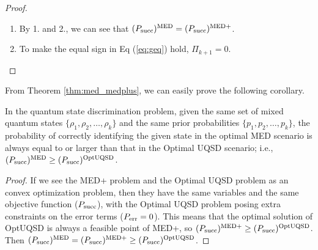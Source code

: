 \begin{proof}
\begin{enumerate}
              by
              \begin{align*}
                  \Pi_{1}' = \Pi_{1}, \; \Pi_{2}' = \Pi_{2}, \; \dots,
                  \; \Pi_{k}' = \Pi_{k} + \Pi_{k+1}
              \end{align*}
              Then,
              \begin{align}
                  (\psucc)\supmed & \geq (\psucc)^{P}
                  = \sum_{i=1}^{k} p_{i} \operatorname{tr}(\rho_{i} \Pi_{i}')                           \\
                                  & = \sum_{i=1}^{k} p_{i} \operatorname{tr}(\rho_{i} \Pi_{i})
                  + p_{k} \operatorname{tr}(\rho_{i} \Pi_{k+1})                                         \\
                                  & = (\psucc)\supmedplus + p_{k} \operatorname{tr}(\rho_{i} \Pi_{k+1}) \\
                                  & \geq (\psucc)\supmedplus \label{eq:geq}
              \end{align}
        \item By 1. and 2., we can see that $(P_{\mathrm{succ}})^{\textnormal{MED}} = (P_{\mathrm{succ}})^{\textnormal{MED+}}$.
        \item To make the equal sign in Eq (\ref{eq:geq}) hold, $\Pi_{k+1} = 0$.
    \end{enumerate}
\end{proof}

From Theorem \ref{thm:med_medplus}, we can easily prove the
following corollary.
\begin{corollary}
    In the quantum state discrimination problem, given the same set of
    mixed quantum states $\{ \rho_{1}, \rho_{2}, \dots, \rho_{k} \}$
    and the same prior probabilities $\{p_{1}, p_{2}, \dots, p_{k}\}$, the \\
    probability of correctly identifying the given state in the optimal
    MED scenario is always equal to or larger than that in the Optimal UQSD
    scenario; i.e.,
    $(P_{\mathrm{succ}})^{\textnormal{MED}} \geq (P_{\mathrm{succ}})^{\textnormal{OptUQSD}}$.
\end{corollary}

\begin{proof}
    If we see the MED+ problem and the Optimal UQSD problem as an convex
    optimization problem, then they have the same variables and the same
    objective function ($P_{\mathrm{succ}}$), with the Optimal UQSD problem posing extra
    constraints on the error terms ($P_{\mathrm{err}} = 0$).
    This means that the optimal solution of OptUQSD is always a feasible point
    of MED+, so $(P_{\mathrm{succ}})^{\textnormal{MED+}} \geq (P_{\mathrm{succ}})^{\textnormal{OptUQSD}}$.
    Then $(P_{\mathrm{succ}})^{\textnormal{MED}} = (P_{\mathrm{succ}})^{\textnormal{MED+}} \geq (P_{\mathrm{succ}})^{\textnormal{OptUQSD}}$.
\end{proof}

